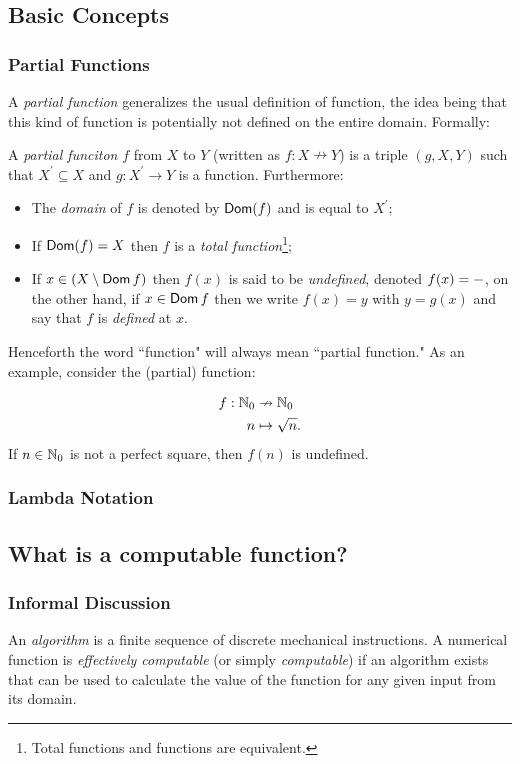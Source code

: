 \subsection{Basic Concepts}
\subsubsection*{Partial Functions}
A \emph{partial function} generalizes the usual definition of function, the idea being that this kind of function is potentially not defined on the entire domain. Formally:
\begin{definition}
	A \emph{partial funciton} $f$ from $X$ to $Y$ (written as $f : X \nrightarrow Y$)  is a triple $(g,X,Y)$ such that $X^\prime \subseteq X$ and $g:X^\prime \to Y$ is a function. Furthermore:
	\begin{itemize}
	 \item 
		The \emph{domain} of $f$ is denoted by $\operatorname{\mathsf{Dom}}(f)$ and is equal to $X^\prime$; 
	 \item
		 If $ \operatorname{\mathsf{Dom}}(f) = X$ then $f$ is a \emph{total function}\footnote{Total functions and functions are equivalent.};
	 \item
		 If $x \in (X \setminus \operatorname{\mathsf{Dom}} f)$ then $f(x)$ is said to be \emph{undefined}, denoted $f(x) = \--$, on the other hand, if $x \in \operatorname{\mathsf{Dom}} f$ then we write $f(x) = y$ with $y = g(x)$ and say that $f$ is \emph{defined} at $x$.  
 \end{itemize}
\end{definition}
Henceforth the word ``function" will always mean ``partial function."  As an example, consider the (partial) function:

\begin{align*}
	f : \mathbb{N}_0  & \nrightarrow  \mathbb{N}_0 \\
		n  & \mapsto       \sqrt n.
\end{align*}
If $n \in \mathbb{N}_0$ is not a perfect square, then $f(n)$ is undefined. 

\subsubsection*{Lambda Notation}

\subsection{What is a computable function?}
\subsubsection*{Informal Discussion}
An \emph{algorithm} is a finite sequence of discrete mechanical instructions. A numerical function is \emph{effectively computable} (or simply \emph{computable}) if an algorithm exists that can be used to calculate the value of the function for any given input from its domain.

